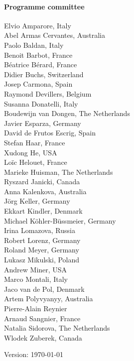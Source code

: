 \documentclass[10pt]{article}
\begin{document}

\newpage
\paragraph*{Programme committee}\mbox{}
\begin{multicols}{2}
\noindent
Elvio Amparore, Italy \\
Abel Armas Cervantes, Australia \\
Paolo Baldan, Italy \\
Benoit Barbot, France  \\
B\'{e}atrice B\'{e}rard, France \\
Didier Buchs, Switzerland \\
Josep Carmona, Spain \\
Raymond Devillers, Belgium \\
Susanna Donatelli, Italy \\
Boudewijn van Dongen, The Netherlands \\
Javier Esparza, Germany \\
David de Frutos Escrig, Spain \\
Stefan Haar, France \\
Xudong He, USA \\
Lo\"{i}c Helouet, France \\
Marieke Huisman, The Netherlands \\
\columnbreak
Ryszard Janicki, Canada \\
Anna Kalenkova, Australia \\
J\"{o}rg Keller, Germany \\
Ekkart Kindler, Denmark \\
Michael K\"{o}hler-B\"{u}ssmeier, Germany \\
Irina Lomazova, Russia \\
Robert Lorenz, Germany \\
Roland Meyer, Germany \\
Lukasz Mikulski, Poland \\
Andrew Miner, USA \\
Marco Montali, Italy \\
Jaco van de Pol, Denmark \\
Artem Polyvyanyy, Australia \\
Pierre-Alain Reynier \\
Arnaud Sangnier, France \\
Natalia Sidorova, The Netherlands \\
Wlodek Zuberek, Canada

{\tiny \textcolor{black!2}{Version: \today{}}}
\end{multicols}
\end{document}
